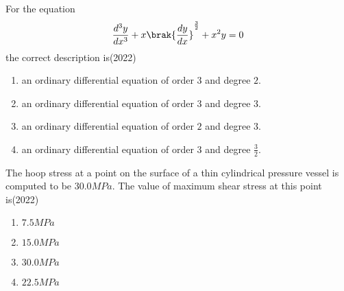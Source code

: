 \item For the equation $$\frac{d^{3}y}{dx^{3}}+x\brak{\frac{dy}{dx}}^{\frac{3}{2}}+x^{2}y=0$$ the correct description is\hfill(2022)
\begin{enumerate}
\item an ordinary differential equation of order $3$ and degree $2$.
\item an ordinary differential equation of order $3$ and degree $3$.
\item an ordinary differential equation of order $2$ and degree $3$.
\item an ordinary differential equation of order $3$ and degree $\frac{3}{2}$.
\end{enumerate}

\item The hoop stress at a point on the surface of a thin cylindrical pressure vessel is computed to be $30.0MPa$. The value of maximum shear stress at this point is\hfill(2022)
\begin{multicols}{2}
\begin{enumerate}
\item $7.5MPa$
\item $15.0MPa$
\item $30.0MPa$
\item $22.5MPa$
\end{enumerate}
\end{multicols}